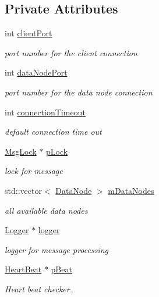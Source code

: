 \subsection*{\-Private \-Attributes}
\begin{DoxyCompactItemize}
\item 
int \hyperlink{classSQSMaster_a89e8b3c4b0da8172f5309bce3ac7dc26}{client\-Port}
\begin{DoxyCompactList}\small\item\em port number for the client connection \end{DoxyCompactList}\item 
int \hyperlink{classSQSMaster_a696a65ad732112ad27f1a1d353c3db63}{data\-Node\-Port}
\begin{DoxyCompactList}\small\item\em port number for the data node connection \end{DoxyCompactList}\item 
int \hyperlink{classSQSMaster_aec49d49c7c3301aaba049672f4a46cb9}{connection\-Timeout}
\begin{DoxyCompactList}\small\item\em default connection time out \end{DoxyCompactList}\item 
\hyperlink{classMsgLock}{\-Msg\-Lock} $\ast$ \hyperlink{classSQSMaster_a22ea7350f17c94861eb488ae5f4f7abb}{p\-Lock}
\begin{DoxyCompactList}\small\item\em lock for message \end{DoxyCompactList}\item 
std\-::vector$<$ \hyperlink{classDataNode}{\-Data\-Node} $>$ \hyperlink{classSQSMaster_a7f575898ece6a5812819780ca7b0c8c4}{m\-Data\-Nodes}
\begin{DoxyCompactList}\small\item\em all available data nodes \end{DoxyCompactList}\item 
\hyperlink{classLogger}{\-Logger} $\ast$ \hyperlink{classSQSMaster_a2c3525b0f014f112f5d425b1a34152c6}{logger}
\begin{DoxyCompactList}\small\item\em logger for message processing \end{DoxyCompactList}\item 
\hyperlink{classHeartBeat}{\-Heart\-Beat} $\ast$ \hyperlink{classSQSMaster_a9a8824c007d04b97b2334f4d332cd707}{p\-Beat}
\begin{DoxyCompactList}\small\item\em \-Heart beat checker. \end{DoxyCompactList}\end{DoxyCompactItemize}


